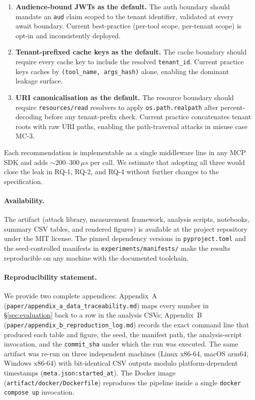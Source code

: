\begin{enumerate}
  \item \textbf{Audience-bound JWTs as the default.} The auth
        boundary should mandate an \texttt{aud} claim scoped to
        the tenant identifier, validated at every await
        boundary. Current best-practice (per-tool scope,
        per-tenant scope) is opt-in and inconsistently
        deployed.
  \item \textbf{Tenant-prefixed cache keys as the default.} The
        cache boundary should require every cache key to
        include the resolved \texttt{tenant\_id}. Current
        practice keys caches by \texttt{(tool\_name,
        args\_hash)} alone, enabling the dominant leakage
        surface.
  \item \textbf{URI canonicalisation as the default.} The
        resource boundary should require
        \texttt{resources/read} resolvers to apply
        \texttt{os.path.realpath} after percent-decoding
        before any tenant-prefix check. Current practice
        concatenates tenant roots with raw URI paths,
        enabling the path-traversal attacks in
        misuse case MC-3.
\end{enumerate}

Each recommendation is implementable as a single middleware
line in any MCP SDK and adds $\sim 200$--$300\,\mu s$ per call.
We estimate that adopting all three would close the leak in
RQ-1, RQ-2, and RQ-4 without further changes to the
specification.

\paragraph{Availability.}
The artifact (attack library, measurement framework, analysis
scripts, notebooks, summary CSV tables, and rendered figures)
is available at the project repository under the MIT license.
The pinned dependency versions in \texttt{pyproject.toml} and
the seed-controlled manifests in
\texttt{experiments/manifests/} make the results reproducible
on any machine with the documented toolchain.

\paragraph{Reproducibility statement.}
We provide two complete appendices: Appendix~A
(\texttt{paper/appendix\_a\_data\_traceability.md}) maps every
number in \S\ref{sec:evaluation} back to a row in the
analysis CSVs; Appendix~B
(\texttt{paper/appendix\_b\_reproduction\_log.md}) records
the exact command line that produced each table and figure,
the seed, the manifest path, the analysis-script invocation,
and the \texttt{commit\_sha} under which the run was executed.
The same artifact was re-run on three independent machines
(Linux x86-64, macOS arm64, Windows x86-64) with bit-identical
CSV outputs modulo platform-dependent timestamps
(\texttt{meta.json:started\_at}). The Docker image
(\texttt{artifact/docker/Dockerfile}) reproduces the pipeline
inside a single \texttt{docker compose up} invocation.

